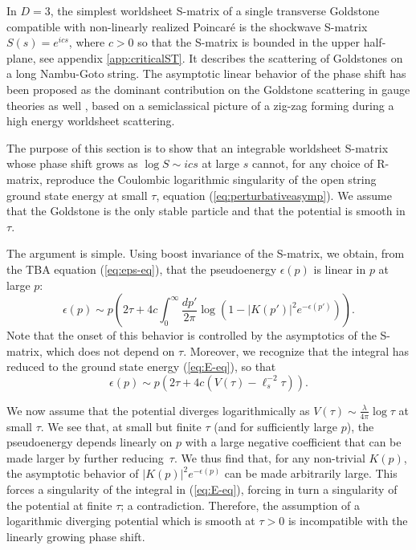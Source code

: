 \documentclass[
 reprint,
 amsmath,
 pre,
 amssymb,
 nofootinbib,
 aps,
 longbibliography,
]{revtex4-1}
\newcommand{\eps}{\varepsilon}
\newcommand{\<}{{\langle}}
\renewcommand{\>}{{\rangle}}
\def\eps{{\epsilon}}
\begin{document}
In $D=3$, the simplest worldsheet S-matrix of a single transverse Goldstone compatible with non-linearly realized Poincaré is the shockwave S-matrix $    S(s)= e^{i c s}$, where $c>0$ so that the S-matrix is bounded in the upper half-plane, see appendix \ref{app:criticalST}. It describes the scattering of Goldstones on a long Nambu-Goto string. The asymptotic linear behavior of the phase shift has been proposed as the dominant contribution on the Goldstone scattering in gauge theories as well \cite{Dubovsky_2018}, based on a semiclassical picture of a zig-zag forming during a high energy worldsheet scattering.

The purpose of this section is to show that an integrable worldsheet S-matrix whose phase shift grows as $\log S \sim i cs$ at large $s$ cannot, for any choice of R-matrix, reproduce the Coulombic logarithmic singularity of the open string ground state energy at small $\tau$, equation (\ref{eq:perturbativeasymp}). We assume that the Goldstone is the only stable particle and that the potential is smooth in $\tau$.

The argument is simple. Using boost invariance of the S-matrix, we obtain, from the TBA equation (\ref{eq:eps-eq}), that the pseudoenergy $\eps(p)$ is linear in $p$ at large $p$:
\begin{equation}
    \eps(p) \sim p \left(2 \tau + 4c \int_0^\infty \frac{dp'}{2\pi} \log\left(1-|K(p')|^2 e^{-\eps(p')}\right)\right).
\end{equation}
Note that the onset of this behavior is controlled by the asymptotics of the S-matrix, which does not depend on $\tau$. Moreover, we recognize that the integral has reduced to the ground state energy (\ref{eq:E-eq}), so that
\begin{equation}
    \eps(p) \sim p \left(2  \tau + 4 c \left(V(\tau) - \ell_s^{-2}\tau\right)\right).
\end{equation}

We now assume that the potential diverges logarithmically as $V(\tau)\sim \frac{\lambda}{4\pi} \log \tau$ at small $\tau$. We see that, at small but finite $\tau$ (and for sufficiently large $p$), the pseudoenergy depends linearly on $p$ with a large negative coefficient that can be made larger by further reducing~$\tau$. We thus find that, for any non-trivial $K(p)$, the asymptotic behavior of $|K(p)|^2 e^{-\eps(p)}$ can be made arbitrarily large.
This forces a singularity of the integral in (\ref{eq:E-eq}), forcing in turn a singularity of the potential at finite $\tau$; a contradiction. Therefore, the assumption of a logarithmic diverging potential which is smooth at $\tau >0$ is incompatible with the linearly growing phase shift.
\end{document}
